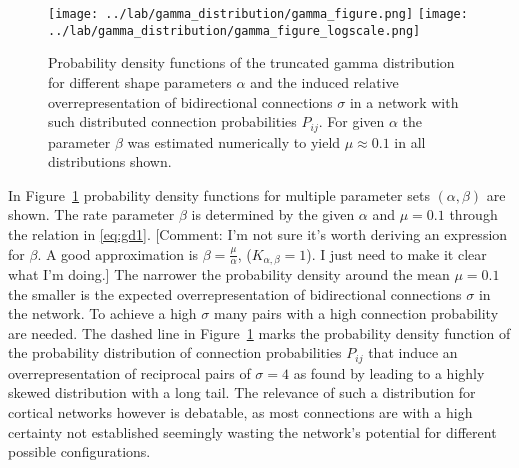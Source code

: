 \begin{figure}[h!]
\centering
\texttt{[image: ../lab/gamma\_distribution/gamma\_figure.png]}
\texttt{[image: ../lab/gamma\_distribution/gamma\_figure\_logscale.png]}
\caption{Probability density functions of the truncated gamma distribution for different shape parameters $\alpha$ and the induced relative overrepresentation of bidirectional connections $\sigma$ in a network with such distributed connection probabilities $P_{ij}$. For given $\alpha$ the parameter $\beta$ was estimated numerically to yield $\mu \approx 0.1$ in all distributions shown.}
\label{fig:gd}
\end{figure}

In Figure~\ref{fig:gd} probability density functions for multiple parameter sets $(\alpha, \beta)$ are shown. The rate parameter $\beta$ is determined by the given $\alpha$ and $\mu = 0.1$ through the relation in \eqref{eq:gd1}. [Comment: I'm not sure it's worth deriving an expression for $\beta$. A good approximation is $\beta = \frac{\mu}{\alpha}$, ($K_{\alpha,\beta} = 1$). I just need to make it clear what I'm doing.]
The narrower the probability density around the mean $\mu = 0.1$ the smaller is the expected overrepresentation of bidirectional connections $\sigma$ in the network. To achieve a high $\sigma$ many pairs with a high connection probability are needed. The dashed line in Figure~\ref{fig:gd} marks the probability density function of the probability distribution of connection probabilities $P_{ij}$ that induce an overrepresentation of reciprocal pairs of $\sigma = 4$ as found by \textcite{Song2005} leading to a highly skewed distribution with a long tail. The relevance of such a distribution for cortical networks however is debatable, as most connections are with a high certainty not established seemingly wasting the network's potential for different possible configurations.






